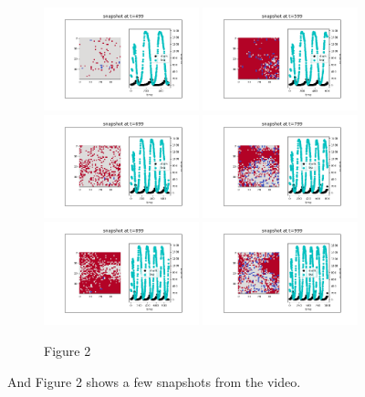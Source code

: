 \documentclass{article}
\begin{document}
\begin{figure}[htp]
    \includegraphics[width=0.4\textwidth]{499.png}
    \includegraphics[width=0.4\textwidth]{599.png}
    \includegraphics[width=0.4\textwidth]{699.png}
    \includegraphics[width=0.4\textwidth]{799.png}
    \includegraphics[width=0.4\textwidth]{899.png}
    \includegraphics[width=0.4\textwidth]{999.png}
    \caption*{Figure 2}
    \label{fig:two}
\end{figure}
And Figure 2 shows a few snapshots from the video.\par
\end{document}
